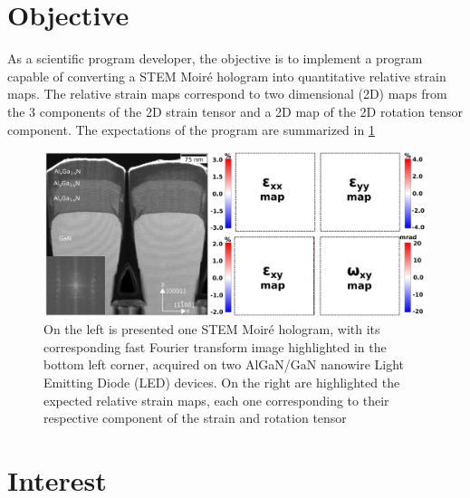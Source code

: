 \documentclass{article}
\begin{document}
\section{Objective}

As a scientific program developer, the objective is to implement a program capable of converting a STEM Moir{\'e} hologram into quantitative relative strain maps. The relative strain maps correspond to two dimensional (2D) maps from the 3 components of the 2D strain tensor and a 2D map of the 2D rotation tensor component. The expectations of the program are summarized in \cref{fig:STEM_Moire_GPA_Objective}

\begin{figure}[H]
\centering
\includegraphics[width=\linewidth]{Figures/STEM_Moire_GPA_objective.png}
\caption[STEM Moir{\'e} GPA objective]{On the left is presented one STEM Moir{\'e} hologram, with its corresponding fast Fourier transform image highlighted in the bottom left corner, acquired on two AlGaN/GaN nanowire Light Emitting Diode (LED) devices. On the right are highlighted the expected relative strain maps, each one corresponding to their respective component of the strain and rotation tensor}
\label{fig:STEM_Moire_GPA_Objective}
\end{figure}

\section{Interest}
\end{document}
